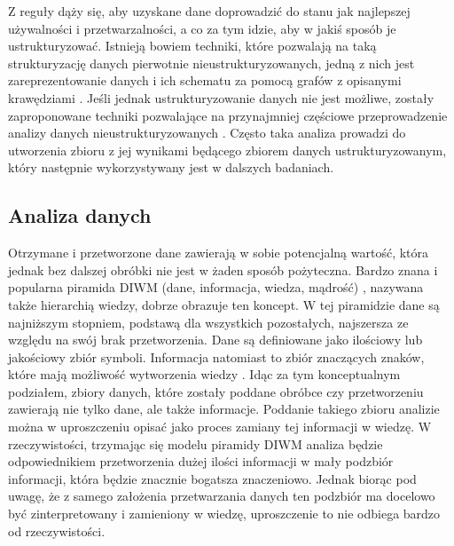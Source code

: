 	Z reguły dąży się, aby uzyskane dane doprowadzić do stanu jak najlepszej używalności i przetwarzalności, a co za tym idzie, aby w jakiś sposób je ustrukturyzować.
	Istnieją bowiem techniki, które pozwalają na taką strukturyzację danych pierwotnie nieustrukturyzowanych, jedną z nich jest zareprezentowanie danych i ich schematu za pomocą grafów z opisanymi krawędziami \cite{buneman1997adding}.
	Jeśli jednak ustrukturyzowanie danych nie jest możliwe, zostały zaproponowane techniki pozwalające na przynajmniej częściowe przeprowadzenie analizy danych nieustrukturyzowanych \cite{boulton1996analysis}.
	Często taka analiza prowadzi do utworzenia zbioru z jej wynikami będącego zbiorem danych ustrukturyzowanym, który następnie wykorzystywany jest w dalszych badaniach.

	\subsection{Analiza danych}

	Otrzymane i przetworzone dane zawierają w sobie potencjalną wartość, która jednak bez dalszej obróbki nie jest w żaden sposób pożyteczna.
	Bardzo znana i popularna piramida DIWM (dane, informacja, wiedza, mądrość) \cite{rowley2007wisdom}, nazywana także hierarchią wiedzy, dobrze obrazuje ten koncept.
	W tej piramidzie dane są najniższym stopniem, podstawą dla wszystkich pozostałych, najszersza ze względu na swój brak przetworzenia.
	Dane są definiowane jako ilościowy lub jakościowy zbiór symboli.
	Informacja natomiast to zbiór znaczących znaków, które mają możliwość wytworzenia wiedzy \cite{zins2007conceptual}.
	Idąc za tym konceptualnym podziałem, zbiory danych, które zostały poddane obróbce czy przetworzeniu zawierają nie tylko dane, ale także informacje.
	Poddanie takiego zbioru analizie można w uproszczeniu opisać jako proces zamiany tej informacji w wiedzę.
	W rzeczywistości, trzymając się modelu piramidy DIWM analiza będzie odpowiednikiem przetworzenia dużej ilości informacji w mały podzbiór informacji, która będzie znacznie bogatsza znaczeniowo.
	Jednak biorąc pod uwagę, że z samego założenia przetwarzania danych ten podzbiór ma docelowo być zinterpretowany i zamieniony w wiedzę, uproszczenie to nie odbiega bardzo od rzeczywistości.


